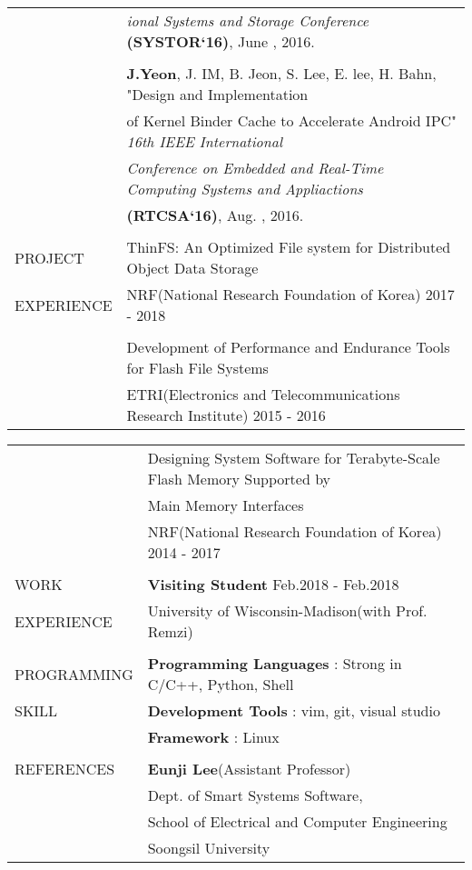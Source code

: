 \documentclass[letterpaper,11pt,oneside]{article}
\begin{document}
\begin{tabular}{@{} l l}
	&\textit{ional Systems and Storage Conference} \textbf{(SYSTOR`16)}, June , 2016.\\
	&\\
	&\textbf{J.Yeon}, J. IM, B. Jeon, S. Lee, E. lee, H. Bahn, "Design and Implementation\\
	&of Kernel Binder Cache to Accelerate Android IPC" \textit{16th IEEE International} \\
	&\textit{Conference on Embedded and Real-Time Computing Systems and Appliactions}\\
	&\textbf{(RTCSA`16)}, Aug. , 2016.\\
    & \\
  \Large{PROJECT}   & ThinFS: An Optimized File system for Distributed Object Data Storage \\
    \Large{EXPERIENCE}   & NRF(National Research Foundation of Korea) 2017 - 2018 \\
     & \\
     &Development of Performance and Endurance Tools for Flash File Systems\\
     &ETRI(Electronics and Telecommunications Research Institute) 2015 - 2016\\    

\end{tabular}

\newpage


\noindent \begin{tabular}{@{} l l}
	 &Designing System Software for Terabyte-Scale Flash Memory Supported by \\
     &Main Memory Interfaces\\
     &NRF(National Research Foundation of Korea) 2014 - 2017\\
	 &\\
 \Large{WORK}    & \textbf{Visiting Student} \null\hfill Feb.2018 - Feb.2018\\
  \Large{EXPERIENCE}   & University of Wisconsin-Madison(with Prof. Remzi) \\
     & \\

 \Large{PROGRAMMING}    & \textbf{Programming Languages} : Strong in C/C++, Python, Shell\\
  \Large{SKILL}   & \textbf{Development Tools} : vim, git, visual studio \\
  	& \textbf{Framework} : Linux\\
    & \\
 \Large{REFERENCES} & \textbf{Eunji Lee}(Assistant Professor)\\
	&Dept. of Smart Systems Software,\\
	&School of Electrical and Computer Engineering\\
	&Soongsil University\\
\end{tabular}



\clearpage
\setlength\parindent{0cm}
\end{document}
